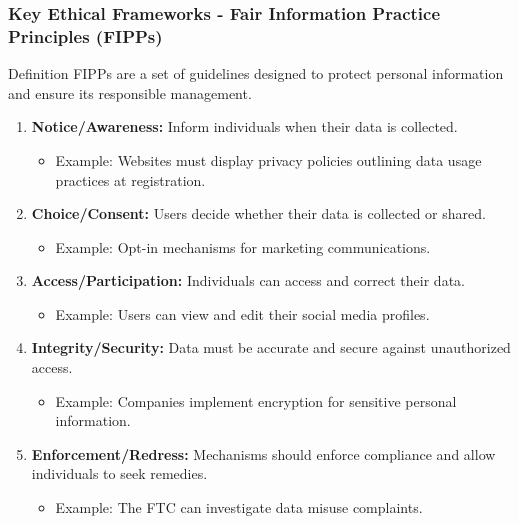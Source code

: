 \documentclass[aspectratio=169]{beamer}
\begin{document}
\begin{frame}[fragile]
    \frametitle{Key Ethical Frameworks - Fair Information Practice Principles (FIPPs)}
    \begin{block}{Definition}
        FIPPs are a set of guidelines designed to protect personal information and ensure its responsible management.
    \end{block}

    \begin{enumerate}
        \item \textbf{Notice/Awareness:} Inform individuals when their data is collected.
            \begin{itemize}
                \item Example: Websites must display privacy policies outlining data usage practices at registration.
            \end{itemize}
        \item \textbf{Choice/Consent:} Users decide whether their data is collected or shared.
            \begin{itemize}
                \item Example: Opt-in mechanisms for marketing communications.
            \end{itemize}
        \item \textbf{Access/Participation:} Individuals can access and correct their data.
            \begin{itemize}
                \item Example: Users can view and edit their social media profiles.
            \end{itemize}
        \item \textbf{Integrity/Security:} Data must be accurate and secure against unauthorized access.
            \begin{itemize}
                \item Example: Companies implement encryption for sensitive personal information.
            \end{itemize}
        \item \textbf{Enforcement/Redress:} Mechanisms should enforce compliance and allow individuals to seek remedies.
            \begin{itemize}
                \item Example: The FTC can investigate data misuse complaints.
            \end{itemize}
    \end{enumerate}
\end{frame}
\end{document}
